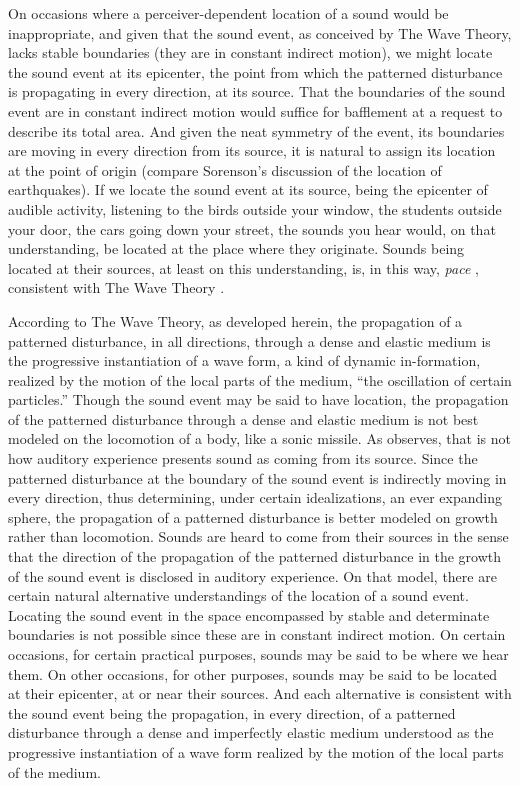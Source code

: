 On occasions where a perceiver-dependent location of a sound would be inappropriate, and given that the sound event, as conceived by The Wave Theory, lacks stable boundaries (they are in constant indirect motion), we might locate the sound event at its epicenter, the point from which the patterned disturbance is propagating in every direction, at its source. That the boundaries of the sound event are in constant indirect motion would suffice for bafflement at a request to describe its total area. And given the neat symmetry of the event, its boundaries are moving in every direction from its source, it is natural to assign its location at the point of origin (compare Sorenson's \citeyear[138--9]{Sorensen:2009aa} discussion of the location of earthquakes). If we locate the sound event at its source, being the epicenter of audible activity, listening to the birds outside your window, the students outside your door, the cars going down your street, the sounds you hear would, on that understanding, be located at the place where they originate. Sounds being located at their sources, at least on this understanding, is, in this way, \emph{pace} \citet{Pasnau:1999ss}, consistent with The Wave Theory \citep[see][123, for a partial anticipation of this point]{OShaughnessy:2009aa}.

According to The Wave Theory, as developed herein, the propagation of a patterned disturbance, in all directions, through a dense and elastic medium is the progressive instantiation of a wave form, a kind of dynamic in-formation, realized by the motion of the local parts of the medium, ``the oscillation of certain particles.'' Though the sound event may be said to have location, the propagation of the patterned disturbance through a dense and elastic medium is not best modeled on the locomotion of a body, like a sonic missile. As \citet{OCallaghan:2007xy,OCallaghan:2009aa} observes, that is not how auditory experience presents sound as coming from its source.  Since the patterned disturbance at the boundary of the sound event is indirectly moving in every direction, thus determining, under certain idealizations, an ever expanding sphere, the propagation of a patterned disturbance is better modeled on growth rather than locomotion. Sounds are heard to come from their sources in the sense that the direction of the propagation of the patterned disturbance in the growth of the sound event is disclosed in auditory experience. On that model, there are certain natural alternative understandings of the location of a sound event. Locating the sound event in the space encompassed by stable and determinate boundaries is not possible since these are in constant indirect motion. On certain occasions, for certain practical purposes, sounds may be said to be where we hear them. On other occasions, for other purposes, sounds may be said to be located at their epicenter, at or near their sources. And each alternative is consistent with the sound event being the propagation, in every direction, of a patterned disturbance through a dense and imperfectly elastic medium understood as the progressive instantiation of a wave form realized by the motion of the local parts of the medium. 

